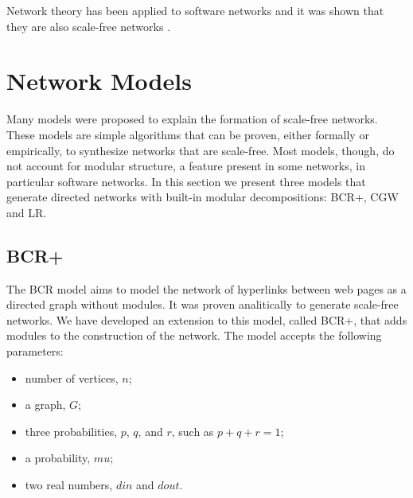 Network theory has been applied to software networks and it was shown that they
are also scale-free networks \cite{Myers2003,Valverde2003}.

%

\section{Network Models}

Many models were proposed to explain the formation of scale-free networks. These
models are simple algorithms that can be proven, either formally or empirically,
to synthesize networks that are scale-free. Most models, though, do not account
for modular structure, a feature present in some networks, in particular
software networks. In this section we present three models that generate
directed networks with built-in modular decompositions: BCR+, CGW and LR. 




\subsection{BCR+}

The BCR model \cite{Bollobas2003} aims to model the network of hyperlinks
between web pages as a directed graph without modules. It was proven
analitically to generate scale-free networks. We have developed an extension to
this model, called BCR+, that adds modules to the construction of the network.
The model accepts the following parameters:

\begin{itemize}
\item number of vertices, $n$;
\item a graph, $G$;
\item three probabilities, $p$, $q$, and $r$, such as $p + q + r = 1$;
\item a probability, $mu$;
\item two real numbers, $din$ and $dout$.
\end{itemize}

